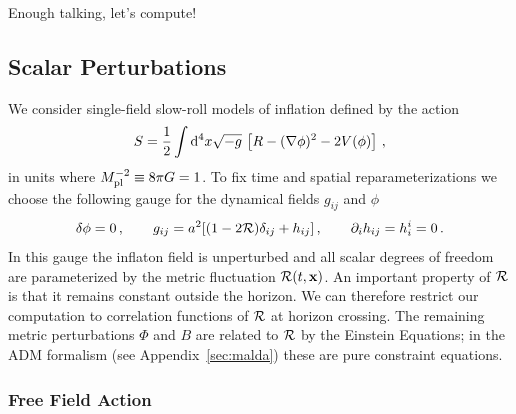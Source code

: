 \documentclass[12pt,letterpaper,rotate]{article}
\def\beq{\begin{equation}}
\def\eeq{\end{equation}}
\def\Mp{M_{\rm pl}}
\def\d{{\rm d}}
\def\R{{\cal R}}
\begin{document}
{\noindent
Enough talking, let's compute!

\subsection{Scalar Perturbations}

We consider single-field slow-roll models of inflation 
defined by the action
\beq
\label{equ:SRaction1}
S = \frac{1}{2} \int \d^4 x \sqrt{-g}\, \left[R-(\nabla \phi)^2 - 2 V(\phi)
\right]\, , %
\eeq
in units where $ \Mp^{-2} \equiv 8 \pi G = 1$.
To fix time and spatial reparameterizations we choose the following gauge for the dynamical fields $g_{ij}$ and $\phi$ 
\beq
\delta \phi = 0\, , \qquad g_{ij} = a^2 [(1- 2 \R) \delta_{ij} + h_{ij}]\, , \qquad \partial_i h_{ij} = h^i_{i} = 0\, .
\eeq
In this gauge the inflaton field is unperturbed and all scalar degrees of freedom are parameterized by the metric fluctuation
$\R(t, {\bf x})$.  
An important property of $\R$ is that it remains constant outside the horizon.  We can therefore restrict our computation to correlation functions of $\R$ at horizon crossing.
The remaining metric perturbations $\Phi$ and $B$ are related to $\R$ by the Einstein Equations; in the ADM formalism (see Appendix~\ref{sec:malda}) these are pure constraint equations.

\subsubsection{Free Field Action}

}
\end{document}
